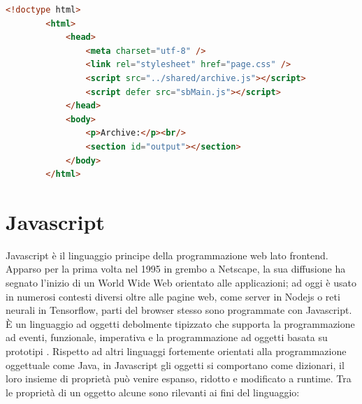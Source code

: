 \documentclass{sapthesis}
\newcommand{\www}{World Wide Web}
\newcommand{\JS}{Javascript}
\begin{document}
        \begin{lstlisting}[label={code:esempio-html},caption={Un semplice documento html},captionpos=b,language=HTML]
        <!doctype html>
        <html>
            <head>
                <meta charset="utf-8" />
                <link rel="stylesheet" href="page.css" />
                <script src="../shared/archive.js"></script>
                <script defer src="sbMain.js"></script>
            </head>
            <body>
                <p>Archive:</p><br/>
                <section id="output"></section>
            </body>
        </html>
        \end{lstlisting}

    
    \section{Javascript}
    \label{sec:javascript}
        \JS{} è il linguaggio principe della programmazione web lato frontend. Apparso per la
        prima volta nel 1995 in grembo a Netscape, la sua diffusione ha segnato l'inizio di un \www{}
        orientato alle applicazioni; ad oggi è usato in numerosi contesti diversi oltre alle pagine web,
        come server in Nodejs o reti neurali in Tensorflow, parti del browser stesso sono programmate
        con \JS{}. 
        È un linguaggio ad oggetti debolmente tipizzato che supporta la programmazione ad eventi, 
        funzionale, imperativa e la programmazione ad oggetti basata su prototipi \cite{javascript-introduction}.
        Rispetto ad altri linguaggi fortemente orientati alla programmazione oggettuale come Java, in \JS{}
        gli oggetti si comportano come dizionari, il loro insieme di proprietà può venire espanso, ridotto e 
        modificato a runtime. Tra le proprietà di un oggetto alcune sono rilevanti ai fini del linguaggio:
\end{document}
